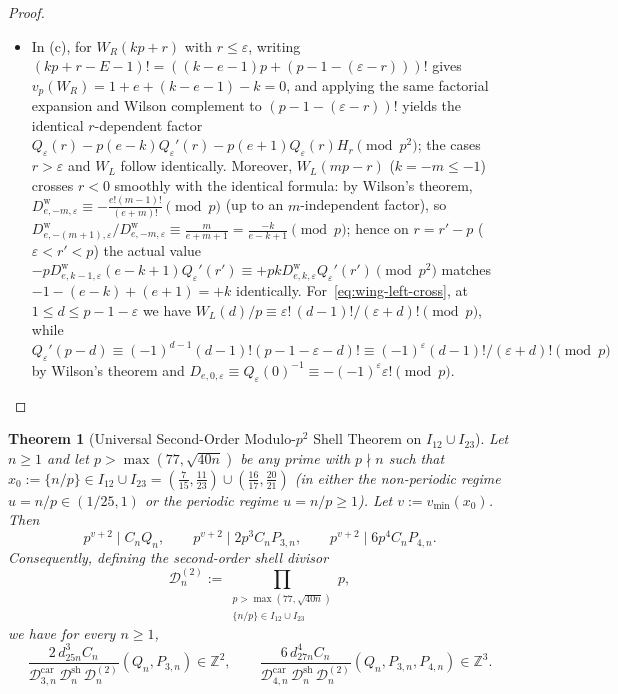 \documentclass[11pt,reqno]{amsart}
\newtheorem{theorem}{Theorem}[section]
\theoremstyle{definition}
\theoremstyle{remark}
\newcommand{\ZZ}{\mathbb{Z}}
\begin{document}
\begin{proof}
\begin{itemize}
  \item In (c), for $W_R(kp+r)$ with $r \le \varepsilon$, writing $(kp+r-E-1)! = ((k-e-1)p + (p-1-(\varepsilon-r)))!$ gives $v_p(W_R) = 1 + e + (k-e-1) - k = 0$, and applying the same factorial expansion and Wilson complement to $(p - 1 - (\varepsilon - r))!$ yields the identical $r$-dependent factor $Q_\varepsilon(r) - p(e-k)Q_\varepsilon'(r) - p(e+1)Q_\varepsilon(r) H_r \pmod{p^2}$; the cases $r > \varepsilon$ and $W_L$ follow identically. Moreover, $W_L(mp - r)$ ($k = -m \le -1$) crosses $r < 0$ smoothly with the identical formula: by Wilson's theorem, $D^{\mathrm{w}}_{e,-m,\varepsilon} \equiv -\frac{e!(m-1)!}{(e+m)!} \pmod p$ (up to an $m$-independent factor), so $D^{\mathrm{w}}_{e,-(m+1),\varepsilon}/D^{\mathrm{w}}_{e,-m,\varepsilon} \equiv \frac{m}{e+m+1} = \frac{-k}{e-k+1} \pmod p$; hence on $r = r' - p$ ($\varepsilon < r' < p$) the actual value $-p D^{\mathrm{w}}_{e,k-1,\varepsilon}(e - k + 1) Q_\varepsilon'(r') \equiv +p k D^{\mathrm{w}}_{e,k,\varepsilon} Q_\varepsilon'(r') \pmod{p^2}$ matches $-1 - (e - k) + (e + 1) = +k$ identically. For~\eqref{eq:wing-left-cross}, at $1 \le d \le p - 1 - \varepsilon$ we have $W_L(d)/p \equiv \varepsilon!\,(d-1)!/(\varepsilon+d)! \pmod p$, while $Q_\varepsilon'(p-d) \equiv (-1)^{d-1}(d-1)!(p-1-\varepsilon-d)! \equiv (-1)^{\varepsilon} (d-1)!/(\varepsilon+d)! \pmod p$ by Wilson's theorem and $D_{e,0,\varepsilon} \equiv Q_\varepsilon(0)^{-1} \equiv -(-1)^\varepsilon \varepsilon! \pmod p$. \qedhere
\end{itemize}
\end{proof}

\begin{theorem}[Universal Second-Order Modulo-$p^2$ Shell Theorem on $I_{12} \cup I_{23}$]
\label{thm:second-order}
Let $n \ge 1$ and let $p > \max(77, \sqrt{40n})$ be any prime with $p \nmid n$ such that $x_0 := \{n/p\} \in I_{12} \cup I_{23} = (\frac{7}{15}, \frac{11}{23}) \cup (\frac{16}{17}, \frac{20}{21})$ (in either the non-periodic regime $u = n/p \in (1/25, 1)$ or the periodic regime $u = n/p \ge 1$). Let $v := v_{\min}(x_0)$. Then
\begin{equation}
\label{eq:extra-p2}
  p^{v + 2} \mid C_n Q_n,
  \qquad
  p^{v + 2} \mid 2 p^3 C_n P_{3,n},
  \qquad
  p^{v + 2} \mid 6 p^4 C_n P_{4,n}.
\end{equation}
Consequently, defining the second-order shell divisor
\[
  \mathcal{D}_n^{(2)} := \prod_{\substack{p > \max(77, \sqrt{40n}) \\ \{n/p\} \in I_{12} \cup I_{23}}} p,
\]
we have for every $n \ge 1$,
\begin{equation}
\label{eq:full-int-2nd}
  \frac{2\, d_{25n}^3 C_n}{\mathcal{D}_{3,n}^{\mathrm{car}}\,\mathcal{D}_n^{\mathrm{sh}}\,\mathcal{D}_n^{(2)}}(Q_n, P_{3,n}) \in \ZZ^2,
  \qquad
  \frac{6\, d_{27n}^4 C_n}{\mathcal{D}_{4,n}^{\mathrm{car}}\,\mathcal{D}_n^{\mathrm{sh}}\,\mathcal{D}_n^{(2)}}(Q_n, P_{3,n}, P_{4,n}) \in \ZZ^3.
\end{equation}
\end{theorem}
\end{document}
